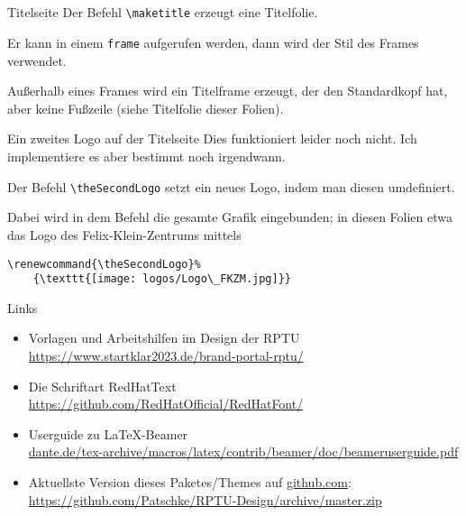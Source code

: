 \documentclass[german,10pt,xcolor=colortbl,compress
]{beamer}
\begin{document}
\subsection*{}
\begin{frame}[fragile]{Titelseite}
	Der Befehl \lstinline|\maketitle| erzeugt eine Titelfolie.

	Er kann in einem \lstinline|frame| aufgerufen werden, dann wird der Stil des Frames verwendet.

	Außerhalb eines Frames wird ein Titelframe erzeugt, der den Standardkopf hat, aber keine Fußzeile (siehe Titelfolie dieser Folien).
\end{frame}
\begin{frame}[fragile]{Ein zweites Logo auf der Titelseite}
	Dies funktioniert leider noch nicht. Ich implementiere es aber bestimmt noch irgendwann.

	Der Befehl \lstinline|\theSecondLogo| setzt ein neues Logo, indem man diesen umdefiniert.

	Dabei wird in dem Befehl die gesamte Grafik eingebunden; in diesen Folien etwa das Logo des Felix-Klein-Zentrums mittels

	\begin{lstlisting}
\renewcommand{\theSecondLogo}%
	{\texttt{[image: logos/Logo\_FKZM.jpg]}}
		\end{lstlisting}
\end{frame}
\begin{frame}{Links}
	\begin{itemize}
		\item Vorlagen und Arbeitshilfen im Design der RPTU\\ \href{https://www.startklar2023.de/brand-portal-rptu/}{https://www.startklar2023.de/brand-portal-rptu/}
		\item Die Schriftart RedHatText\\
		      \href{https://github.com/RedHatOfficial/RedHatFont/}{https://github.com/RedHatOfficial/RedHatFont/}
		\item Userguide zu \LaTeX-Beamer\\ \href{ftp://ftp.dante.de/tex-archive/macros/latex/contrib/beamer/doc/beameruserguide.pdf}{dante.de/tex-archive/macros/latex/contrib/beamer/doc/beameruserguide.pdf}
		\item Aktuellste Version dieses Paketes/Themes auf \href{http://github.com}{github.com}:\\
		      \href{https://github.com/Patschke/RPTU-Design/archive/master.zip}{https://github.com/Patschke/RPTU-Design/archive/master.zip}
	\end{itemize}
\end{frame}
\end{document}
